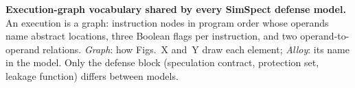 \textbf{Execution-graph vocabulary shared by every SimSpect defense model.} An execution is a graph: instruction nodes in program order whose operands name abstract locations, three Boolean flags per instruction, and two operand-to-operand relations. \emph{Graph}: how Figs.~X and~Y draw each element; \emph{Alloy}: its name in the model. Only the defense block (speculation contract, protection set, leakage function) differs between models.
